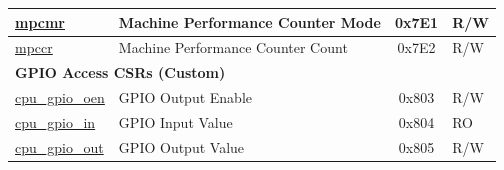 \begin{longtable}{ | p{4.0cm} | p{8.4cm} | c | l | }
\hyperref[regdesc:MPCMR]{mpcmr} & Machine Performance Counter Mode & 0x7E1 & R/W \\\hline
\hyperref[regdesc:MPCCR]{mpccr} & Machine Performance Counter Count & 0x7E2 & R/W \\\hline
\multicolumn{4}{|l|}{\textbf{GPIO Access CSRs (Custom)}} \\\hline
\hyperref[regdesc:GPIO_OEN]{cpu\_gpio\_oen} & GPIO Output Enable & 0x803 & R/W \\\hline
\hyperref[regdesc:GPIO_IN]{cpu\_gpio\_in} & GPIO Input Value & 0x804 & RO \\\hline
\hyperref[regdesc:GPIO_OUT]{cpu\_gpio\_out} & GPIO Output Value & 0x805 & R/W \\\hline
\end{longtable}
